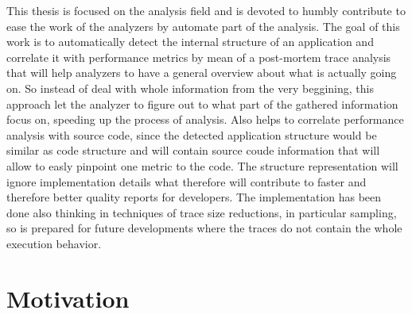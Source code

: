 This thesis is focused on the analysis field and is devoted to humbly contribute 
to ease the work of the analyzers by
automate part of the analysis. The goal of this work is to automatically detect
the internal structure of an application and correlate it with performance metrics by
mean of a post-mortem trace analysis that will help analyzers to have a general
overview about what is actually going on. So instead of deal with whole
information from the very beggining, this approach let the analyzer to figure
out to what part of the gathered information focus on, speeding up the process of
analysis. Also helps to correlate performance analysis with source code, 
since the detected application structure would be similar as
code structure and will contain source coude information that will allow to
easly pinpoint one metric to the code. The structure representation will ignore 
implementation details what therefore will contribute to faster and therefore better 
quality reports for developers. The implementation has been done also thinking 
in techniques of trace size reductions, in particular sampling, so is prepared 
for future developments where the traces do not contain the whole execution behavior.



\section{Motivation}

